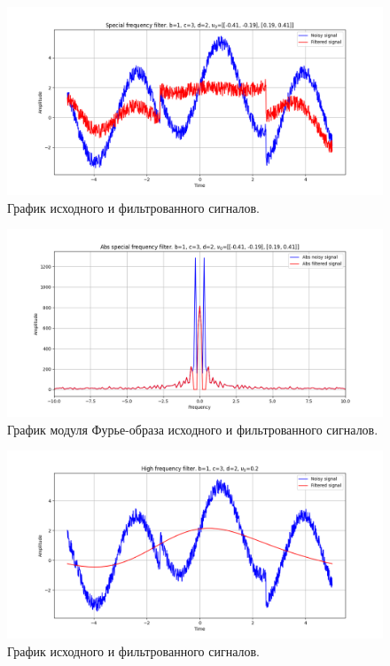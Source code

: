\documentclass[a4paper, 12pt]{article}
\begin{document}
    \begin{figure}[!htb]
        \centering
        \includegraphics[scale=0.485]{4_u_flt_u_nospec_v2.png}
        \captionsetup{skip=0pt}
        \caption{График исходного и фильтрованного сигналов.}
        \label{fig:fig87}
    \end{figure}
    \begin{figure}[!htb]
        \centering
        \includegraphics[scale=0.485]{4_abs_u_U_nospec_v2.png}
        \captionsetup{skip=0pt}
        \caption{График модуля Фурье-образа исходного и фильтрованного сигналов.}
        \label{fig:fig88}
    \end{figure}
    \begin{figure}[!htb]
        \centering
        \includegraphics[scale=0.485]{4_u_flt_u_nospec_v3.png}
        \captionsetup{skip=0pt}
        \caption{График исходного и фильтрованного сигналов.}
        \label{fig:fig89}
    \end{figure}
\end{document}
